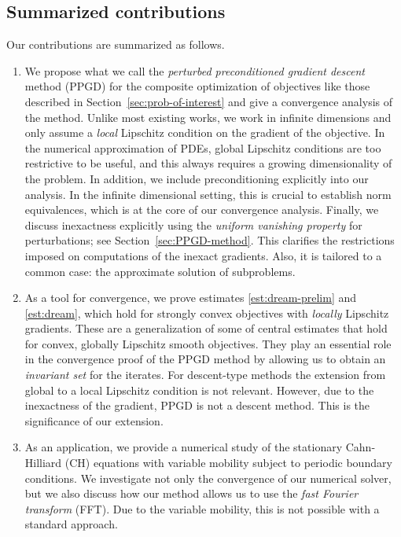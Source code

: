 \documentclass{amsart}
\theoremstyle{definition}
\begin{document}
	\subsection{Summarized contributions}
	\label{sec:contribution}


Our contributions are summarized as follows. 
	\begin{enumerate}[1.]
	\item
We propose what we call the \emph{perturbed preconditioned gradient descent} method (PPGD) for the composite optimization of objectives like those described in Section~\ref{sec:prob-of-interest} and give a convergence analysis of the method. Unlike most existing works, we work in infinite dimensions and only assume a \emph{local} Lipschitz condition on the gradient of the objective. In the numerical approximation of PDEs, global Lipschitz conditions are too restrictive to be useful, and this always requires a growing dimensionality of the problem. In addition, we include preconditioning explicitly into our analysis. In the infinite dimensional setting, this is crucial to establish norm equivalences, which is at the core of our convergence analysis. Finally, we discuss inexactness explicitly using the \emph{uniform vanishing property} for perturbations; see Section~\ref{sec:PPGD-method}. This clarifies the restrictions imposed on computations of the inexact gradients. Also, it is tailored to a common case: the approximate solution of subproblems.

	\item 
As a tool for convergence, we prove estimates \eqref{est:dream-prelim} and \eqref{est:dream}, which hold for strongly convex objectives with \emph{locally} Lipschitz gradients. These are a generalization of some of central estimates that hold for convex, globally Lipschitz smooth objectives. They play an essential role in the convergence proof of the PPGD method by allowing us to obtain an \emph{invariant set} for the iterates. For descent-type methods the extension from global to a local Lipschitz condition is not relevant. However, due to the inexactness of the gradient, PPGD is not a descent method. This is the significance of our extension.
		
	\item 
As an application, we provide a numerical study of the stationary Cahn-Hilliard (CH) equations with variable mobility subject to periodic boundary conditions. We investigate not only the convergence of our numerical solver, but we also discuss how our method allows us to use the \emph{fast Fourier transform} (FFT). Due to the variable mobility, this is not possible with a standard approach.
	\end{enumerate}
\end{document}
